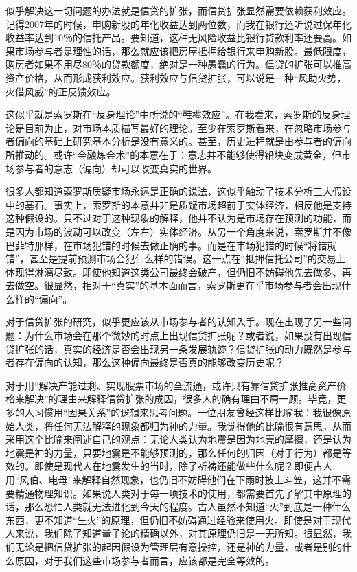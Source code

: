 似乎解决这一切问题的办法就是信贷的扩张，而信贷扩张显然需要依赖获利效应。记得2007年的时候，申购新股的年化收益达到两位数，而我在银行还听说过保年化收益率达到10％的信托产品。要知道，这种无风险收益比银行贷款利率还要高。如果市场参与者是理性的话，那么就应该把房屋抵押给银行来申购新股。最低限度，购房者如果不用尽80％的贷款额度，绝对是一种愚蠢的行为。信贷的扩张可以推高资产价格，从而形成获利效应。获利效应与信贷扩张，可以说是一种“风助火势，火借风威”的正反馈效应。

这似乎就是索罗斯在“反身理论”中所说的“鞋襻效应”。在我看来，索罗斯的反身理论是目前为止，对市场本质描写最好的理论。至少在索罗斯看来，在忽略市场参与者偏向的基础上研究基本分析是没有意义的。甚至，历史进程就是由参与者的偏向所推动的。或许“金融炼金术”的本意在于：意志并不能够使得铅块变成黄金，但市场参与者的意志（偏向）却可以改变真实的世界。

很多人都知道索罗斯质疑市场永远是正确的说法，这似乎触动了技术分析三大假设中的基石。事实上，索罗斯的本意并非是质疑市场超前于实体经济，相反他是支持这种假设的。只不过对于这种现象的解释，他并不认为是市场存在预测的功能，而是因为市场的波动可以改变（左右）实体经济。从另一个角度来说，索罗斯并不像巴菲特那样，在市场犯错的时候去做正确的事。而是在市场犯错的时候“将错就错”，甚至是提前预测市场会犯什么样的错误。这一点在“抵押信托公司”的交易上体现得淋漓尽致。即使他知道这类公司最终会破产，但仍旧不妨碍他先去做多、再去做空。很显然，相对于“真实”的基本面而言，索罗斯更在乎市场参与者会出现什么样的“偏向”。

对于信贷扩张的研究，似乎更应该从市场参与者的认知入手。现在出现了另一些问题：为什么市场会在那个微妙的时点上出现信贷扩张呢？或者说，如果没有出现信贷扩张的话，真实的经济是否会出现另一条发展轨迹？信贷扩张的动力既然是参与者存在偏向的认知，那么这种偏向最终是否真的能够改变历史呢？

对于用“解决产能过剩、实现股票市场的全流通，或许只有靠信贷扩张推高资产价格来解决”的理由来解释信贷扩张的成因，很多人的确有理由不屑一顾。毕竟，更多的人习惯用“因果关系”的逻辑来思考问题。一位朋友曾经这样比喻我：我很像原始人类，将任何无法解释的现象都归为神的力量。我觉得他的比喻很有意思，从而采用这个比喻来阐述自己的观点：无论人类认为地震是因为地壳的摩擦，还是认为地震是神的力量，只要地震是不能够预测的，那么任何的归因（对于行为）都是等效的。即使是现代人在地震发生的当时，除了祈祷还能做些什么呢？即便古人用“风伯、电母”来解释自然现象，也仍旧不妨碍他们在下雨时披上斗笠，这并不需要精通物理知识。如果说人类对于每一项技术的使用，都需要首先了解其中原理的话，那么恐怕人类就无法进化到今天的程度。古人虽然不知道“火”到底是一种什么东西，更不知道“生火”的原理，但仍旧不妨碍通过经验来使用火。即使是对于现代人来说，我们除了知道量子论的精确以外，对其原理仍旧是一无所知。很显然，我们无论是把信贷扩张的起因假设为管理层有意操控，还是神的力量，或者是别的什么原因，对于我们这些市场参与者而言，应该都是完全等效的。

